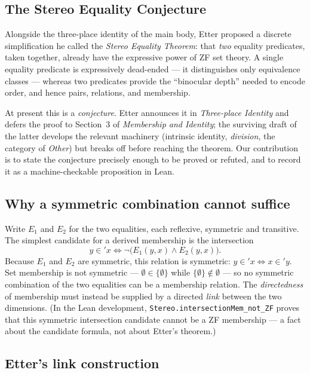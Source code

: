 \documentclass[11pt, a4paper]{article}
\theoremstyle{remark}
\begin{document}
\clearpage
\begin{appendices}
\section{The Stereo Equality Conjecture}
\label{app:stereo}

Alongside the three-place identity of the main body, Etter proposed a discrete simplification he called the \emph{Stereo Equality Theorem}: that \emph{two} equality predicates, taken together, already have the expressive power of ZF set theory. A single equality predicate is expressively dead-ended --- it distinguishes only equivalence classes --- whereas two predicates provide the ``binocular depth'' needed to encode order, and hence pairs, relations, and membership.

At present this is a \emph{conjecture}. Etter announces it in \emph{Three-place Identity}\cite{etter_3pl} and defers the proof to Section~3 of \emph{Membership and Identity}\cite{etter_mem}; the surviving draft of the latter develops the relevant machinery (intrinsic identity, \emph{division}, the category of \emph{Other}) but breaks off before reaching the theorem. Our contribution is to state the conjecture precisely enough to be proved or refuted, and to record it as a machine-checkable proposition in Lean.

\subsection{Why a symmetric combination cannot suffice}

Write $E_1$ and $E_2$ for the two equalities, each reflexive, symmetric and transitive. The simplest candidate for a derived membership is the intersection
\[
y \in' x \iff \neg\bigl(E_1(y, x) \land E_2(y, x)\bigr).
\]
Because $E_1$ and $E_2$ are symmetric, this relation is symmetric: $y \in' x \iff x \in' y$. Set membership is not symmetric --- $\emptyset \in \{\emptyset\}$ while $\{\emptyset\} \notin \emptyset$ --- so no symmetric combination of the two equalities can be a membership relation. The \emph{directedness} of membership must instead be supplied by a directed \emph{link} between the two dimensions. (In the Lean development, \texttt{Stereo.intersectionMem\_not\_ZF} proves that this symmetric intersection candidate cannot be a ZF membership --- a fact about the candidate formula, not about Etter's theorem.)

\subsection{Etter's link construction}


\end{appendices}
\end{document}
